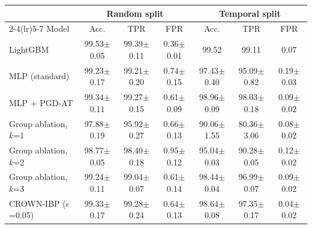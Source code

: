 \begin{tabular}{lcccccc}
\toprule
 & \multicolumn{3}{c}{Random split} & \multicolumn{3}{c}{Temporal split} \\
\cmidrule(lr){2-4}\cmidrule(lr){5-7}
Model & Acc. & TPR & FPR & Acc. & TPR & FPR \\
\midrule
LightGBM & 99.53$\pm$0.05 & 99.39$\pm$0.11 & 0.36$\pm$0.01 & 99.52 & 99.11 & 0.07 \\
MLP (standard) & 99.23$\pm$0.17 & 99.21$\pm$0.20 & 0.74$\pm$0.15 & 97.43$\pm$0.40 & 95.09$\pm$0.82 & 0.19$\pm$0.03 \\
MLP + PGD-AT & 99.34$\pm$0.11 & 99.27$\pm$0.15 & 0.61$\pm$0.09 & 98.96$\pm$0.09 & 98.03$\pm$0.18 & 0.09$\pm$0.02 \\
Group ablation, $k$=1 & 97.88$\pm$0.19 & 95.92$\pm$0.27 & 0.66$\pm$0.13 & 90.06$\pm$1.55 & 80.36$\pm$3.06 & 0.08$\pm$0.02 \\
Group ablation, $k$=2 & 98.77$\pm$0.05 & 98.40$\pm$0.18 & 0.95$\pm$0.12 & 95.04$\pm$0.03 & 90.28$\pm$0.05 & 0.12$\pm$0.02 \\
Group ablation, $k$=3 & 99.24$\pm$0.11 & 99.04$\pm$0.07 & 0.61$\pm$0.14 & 98.44$\pm$0.04 & 96.99$\pm$0.07 & 0.09$\pm$0.02 \\
CROWN-IBP ($\epsilon$=0.05) & 99.33$\pm$0.17 & 99.28$\pm$0.24 & 0.64$\pm$0.13 & 98.64$\pm$0.08 & 97.35$\pm$0.17 & 0.04$\pm$0.02 \\
\bottomrule
\end{tabular}